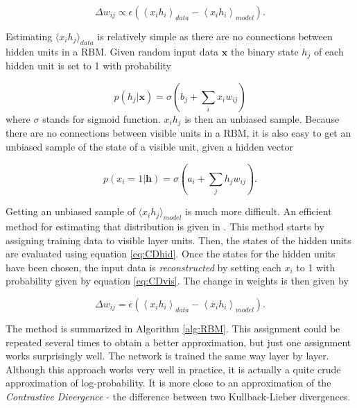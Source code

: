 \begin{equation}
	\Delta w_{ij} \propto \epsilon \left (  \left \langle x_ih_i   \right \rangle_{data} - \left \langle x_ih_i   \right \rangle_{model}   \right ).
\end{equation}

Estimating $ \langle x_ih_j \rangle_{data}$ is relatively simple as there are no connections between hidden units in a RBM. Given random input data $\mathbf{x}$ the binary state $h_j$ of each hidden unit is set to 1 with probability

\begin{equation}
	p(h_j | \mathbf{x}) = \sigma \left ( b_j + \sum_i x_iw_{ij} \right )
	\label{eq:CDhid}
\end{equation}
where $\sigma$ stands for sigmoid function. $x_ih_j$ is then an unbiased sample. Because there are no connections between visible units in a RBM, it is also easy to get an unbiased sample of the state of a visible unit, given a hidden vector

\begin{equation}
	p(x_i=1 | \mathbf{h}) = \sigma \left ( a_i + \sum_jh_jw_{ij} \right ).
	\label{eq:CDvis}
\end{equation}

Getting an unbiased sample of $ \langle x_ih_j \rangle_{model}$ is much more difficult. An efficient method for estimating that distribution is given in \cite{Hinton2002}. This method starts by assigning training data to visible layer units. Then, the states of the hidden units are evaluated using equation \ref{eq:CDhid}. Once the states for the hidden units have been chosen, the input data is \textit{reconstructed} by setting each $x_i$ to 1 with probability given by equation \ref{eq:CDvis}. The change in weights is then given by 

\begin{equation}
	\Delta w_{ij} = \epsilon \left (  \left \langle x_ih_i   \right \rangle_{data} - \left \langle x_ih_i   \right \rangle_{model}   \right ).
\end{equation}

The method is summarized in Algorithm \ref{alg:RBM}. This assignment could be repeated several times to obtain a better approximation, but just one assignment works surprisingly well. The network is trained the same way layer by layer. \\

Although this approach works very well in practice, it is actually a quite crude approximation of  log-probability. It is more close to an approximation of the \textit{Contrastive Divergence} - the difference between two Kullback-Lieber divergences. \\

